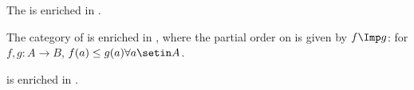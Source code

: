    \begin{example}
        The  \Bool is enriched in \Bool.
    \end{example}

    \begin{example}
        The category \Pos of  is enriched in \Pos, where the partial order on  is given by $f \Imp g$:
        for $f,g : A \to B$, $f(a) \leq g(a) \forall a \setin A$.
    \end{example}


    \begin{example}
        \Category is enriched in \Category.
    \end{example}

